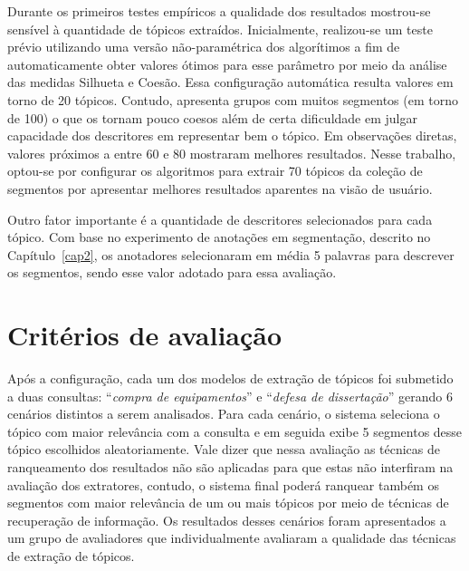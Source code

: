 Durante os primeiros testes empíricos a qualidade dos resultados mostrou-se sensível à quantidade de tópicos extraídos.
Inicialmente, realizou-se um teste prévio utilizando uma versão não-paramétrica dos algorítimos a fim de automaticamente obter valores ótimos para esse parâmetro por meio da análise das medidas Silhueta e Coesão. Essa configuração automática resulta valores em torno de 20 tópicos. Contudo, apresenta grupos com muitos segmentos (em torno de 100) o que os tornam pouco coesos além de certa dificuldade em julgar capacidade dos descritores em representar bem o tópico.  
Em observações diretas, valores próximos a entre 60 e 80 mostraram melhores resultados. Nesse trabalho, optou-se por configurar os algoritmos para extrair 70 tópicos da coleção de segmentos por apresentar melhores resultados aparentes na visão de usuário.

Outro fator importante é a quantidade de descritores selecionados para cada tópico. Com base no experimento de anotações em segmentação, descrito no Capítulo~\ref{cap2}, os anotadores selecionaram em média 5 palavras para descrever os segmentos, sendo esse valor adotado para essa avaliação.




\section{Critérios de avaliação}


Após a configuração, cada um dos modelos de extração de tópicos foi submetido a duas consultas: ``\textit{compra de equipamentos}'' e ``\textit{defesa de dissertação}'' gerando 6 cenários distintos a serem analisados. 
Para cada cenário, o sistema seleciona o tópico com maior relevância com a consulta e em seguida exibe 5 segmentos desse tópico escolhidos aleatoriamente. 
Vale dizer que nessa avaliação as técnicas de ranqueamento dos resultados não são aplicadas para que estas não interfiram na avaliação dos extratores, contudo, o sistema final poderá ranquear também os segmentos com maior relevância de um ou mais tópicos por meio de técnicas de recuperação de informação. 
Os resultados desses cenários foram apresentados a um grupo de avaliadores que individualmente avaliaram a qualidade das técnicas de extração de tópicos. 
%

